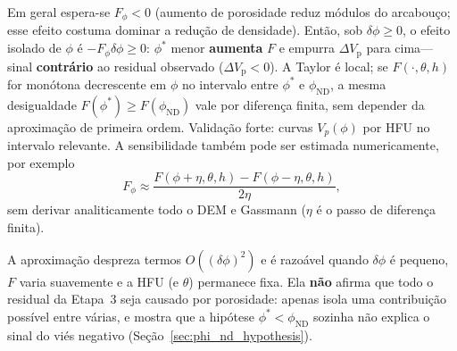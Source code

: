 \documentclass[11pt,a4paper]{article}
\numberwithin{equation}{section}
\newcommand{\phiND}{\ensuremath{\phi_{\mathrm{ND}}}}
\begin{document}
Em geral espera-se $F_\phi<0$
(aumento de porosidade reduz módulos do arcabouço; esse efeito costuma
dominar a redução de densidade).
Então, sob $\delta\phi\ge 0$, o efeito isolado de $\phi$ é
$-F_\phi\delta\phi\ge 0$: $\phi^{*}$ menor \textbf{aumenta} $F$ e
empurra $\Delta V_{\mathrm{p}}$ para cima---sinal \textbf{contrário}
ao residual observado ($\Delta V_{\mathrm{p}}<0$).
A Taylor é local; se $F(\cdot,\theta,h)$ for monótona decrescente em
$\phi$ no intervalo entre $\phi^{*}$ e \phiND{}, a mesma desigualdade
$F(\phi^{*})\ge F(\phiND{})$ vale por diferença finita, sem depender da
aproximação de primeira ordem.
Validação forte: curvas $V_p(\phi)$ por HFU no intervalo relevante.
A sensibilidade também pode ser estimada numericamente, por exemplo
\begin{equation}
  F_\phi
  \approx
  \frac{F(\phi+\eta,\theta,h)-F(\phi-\eta,\theta,h)}{2\eta},
\end{equation}
sem derivar analiticamente todo o DEM e Gassmann
($\eta$ é o passo de diferença finita).

A aproximação despreza termos $O((\delta\phi)^{2})$ e é razoável quando
$\delta\phi$ é pequeno, $F$ varia suavemente e a HFU (e $\theta$) permanece
fixa.
Ela \textbf{não} afirma que todo o residual da Etapa~3 seja causado por
porosidade: apenas isola uma contribuição possível entre várias, e mostra
que a hipótese $\phi^{*}<\phiND{}$ sozinha não explica o sinal do viés
negativo (Seção~\ref{sec:phi_nd_hypothesis}).
\end{document}
